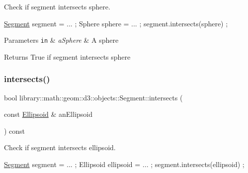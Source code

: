Check if segment intersects sphere. 


\begin{DoxyCode}
\hyperlink{classlibrary_1_1math_1_1geom_1_1d3_1_1objects_1_1_segment_a5562342d1edf2f52e37ce1bc138ee7d7}{Segment} segment = ... ;
Sphere sphere = ... ;
segment.intersects(sphere) ;
\end{DoxyCode}



\begin{DoxyParams}[1]{Parameters}
\mbox{\tt in}  & {\em a\+Sphere} & A sphere \\
\hline
\end{DoxyParams}
\begin{DoxyReturn}{Returns}
True if segment intersects sphere 
\end{DoxyReturn}
\mbox{\label{classlibrary_1_1math_1_1geom_1_1d3_1_1objects_1_1_segment_af6d7eb00a6886d190c03e8b8e4220f33}} 
\subsubsection{\texorpdfstring{intersects()}{intersects()}\hspace{0.1cm}{\footnotesize\ttfamily [3/3]}}
{\footnotesize\ttfamily bool library\+::math\+::geom\+::d3\+::objects\+::\+Segment\+::intersects (\begin{DoxyParamCaption}\item[{const \hyperlink{classlibrary_1_1math_1_1geom_1_1d3_1_1objects_1_1_ellipsoid}{Ellipsoid} \&}]{an\+Ellipsoid }\end{DoxyParamCaption}) const}



Check if segment intersects ellipsoid. 


\begin{DoxyCode}
\hyperlink{classlibrary_1_1math_1_1geom_1_1d3_1_1objects_1_1_segment_a5562342d1edf2f52e37ce1bc138ee7d7}{Segment} segment = ... ;
Ellipsoid ellipsoid = ... ;
segment.intersects(ellipsoid) ;
\end{DoxyCode}



